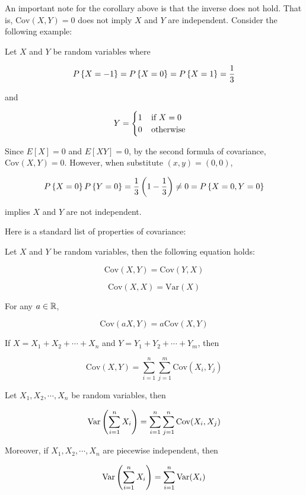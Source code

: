 \documentclass[a4paper,12pt]{article}
\begin{document}
An important note for the corollary above is that the inverse does not hold. That is, $\mathrm{Cov}(X,Y)=0$ does not imply $X$ and $Y$ are independent. Consider the following example:\n

\begin{exm}
  Let $X$ and $Y$ be random variables where
  
  $$P\left\{ X=-1\right\}=P\left\{ X=0\right\}=P\left\{ X=1\right\}=\frac{1}{3}$$\s
  
  and

  $$Y=\begin{cases}
    1\;\;\;\;\text{if }X=0\\
    0\;\;\;\;\text{otherwise}
  \end{cases}$$\s

  Since $E[X]=0$ and $E[XY]=0$, by the second formula of covariance, $\mathrm{Cov}(X,Y)=0$. However, when substitute $(x,y)=(0,0)$,

  $$P\left\{ X=0\right\}P\left\{ Y=0\right\}=\frac{1}{3}\left( 1-\frac{1}{3}\right)\neq 0=P\left\{ X=0,Y=0\right\}$$\s

  implies $X$ and $Y$ are not independent.
\end{exm}\n

Here is a standard list of properties of covariance:\n

\begin{pst}
  Let $X$ and $Y$ be random variables, then the following equation holds:

  \begin{alist}
    \item
    
    $$\mathrm{Cov}(X,Y)=\mathrm{Cov}(Y,X)$$\s

    \item
    
    $$\mathrm{Cov}(X,X)=\mathrm{Var}(X)$$\s

    \item For any $a\in\mathbb{R}$,
    
    $$\mathrm{Cov}(aX,Y)=a\mathrm{Cov}(X,Y)$$\s

    \item If $X=X_{1}+X_{2}+\cdots+X_{n}$ and $Y=Y_{1}+Y_{2}+\cdots+Y_{m}$, then
    
    $$\mathrm{Cov}(X,Y)=\sum_{i=1}^{n}\sum_{j=1}^{m}\mathrm{Cov}(X_{i},Y_{j})$$
  \end{alist}
\end{pst}\n

\begin{crl}
  Let $X_{1},X_{2},\cdots,X_{n}$ be random variables, then

  $$\mathrm{Var}\left( \sum_{i=1}^{n}X_{i}\right)=\sum_{i=1}^{n}\sum_{j=1}^{n}\mathrm{Cov}(X_{i},X_{j})$$\s

  Moreover, if $X_{1},X_{2},\cdots,X_{n}$ are piecewise independent, then

  $$\mathrm{Var}\left( \sum_{i=1}^{n}X_{i}\right)=\sum_{i=1}^{n}\mathrm{Var}(X_{i})$$
\end{crl}
\end{document}
